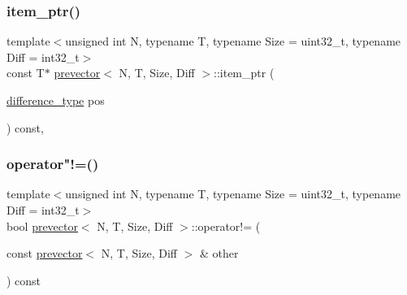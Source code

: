 \mbox{\label{classprevector_a519b06f5a6fc5c9dce4c0bb1b0d985b7}} 
\subsubsection{\texorpdfstring{item\+\_\+ptr()}{item\_ptr()}\hspace{0.1cm}{\footnotesize\ttfamily [2/2]}}
{\footnotesize\ttfamily template$<$unsigned int N, typename T, typename Size = uint32\+\_\+t, typename Diff = int32\+\_\+t$>$ \\
const T$\ast$ \mbox{\hyperlink{classprevector}{prevector}}$<$ N, T, Size, Diff $>$\+::item\+\_\+ptr (\begin{DoxyParamCaption}\item[{\mbox{\hyperlink{classprevector_a34ad7f610eefb33a8db9161cadf15dbe}{difference\+\_\+type}}}]{pos }\end{DoxyParamCaption}) const\hspace{0.3cm}{\ttfamily [inline]}, {\ttfamily [private]}}

\mbox{\label{classprevector_ab82592ccb4e1434025472492549e0c6d}} 
\subsubsection{\texorpdfstring{operator"!=()}{operator!=()}}
{\footnotesize\ttfamily template$<$unsigned int N, typename T, typename Size = uint32\+\_\+t, typename Diff = int32\+\_\+t$>$ \\
bool \mbox{\hyperlink{classprevector}{prevector}}$<$ N, T, Size, Diff $>$\+::operator!= (\begin{DoxyParamCaption}\item[{const \mbox{\hyperlink{classprevector}{prevector}}$<$ N, T, Size, Diff $>$ \&}]{other }\end{DoxyParamCaption}) const\hspace{0.3cm}{\ttfamily [inline]}}

\mbox{\label{classprevector_aa599ca1a3ab1fef2736b831ffed19d04}} 

